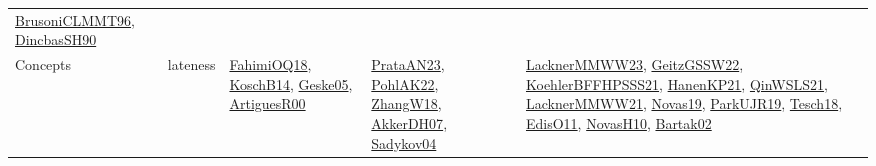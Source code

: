 {\begin{longtable}{lp{3cm}>{\raggedright}p{6cm}>{\raggedright}p{6cm}p{8cm}}
\href{papers/BrusoniCLMMT96.pdf}{BrusoniCLMMT96}\cite{BrusoniCLMMT96}, \href{articles/DincbasSH90.pdf}{DincbasSH90}\cite{DincbasSH90}\\
Concepts & lateness & \href{articles/FahimiOQ18.pdf}{FahimiOQ18}\cite{FahimiOQ18}, \href{papers/KoschB14.pdf}{KoschB14}\cite{KoschB14}, \href{papers/Geske05.pdf}{Geske05}\cite{Geske05}, \href{articles/ArtiguesR00.pdf}{ArtiguesR00}\cite{ArtiguesR00} & \href{articles/PrataAN23.pdf}{PrataAN23}\cite{PrataAN23}, \href{articles/PohlAK22.pdf}{PohlAK22}\cite{PohlAK22}, \href{articles/ZhangW18.pdf}{ZhangW18}\cite{ZhangW18}, \href{papers/AkkerDH07.pdf}{AkkerDH07}\cite{AkkerDH07}, \href{papers/Sadykov04.pdf}{Sadykov04}\cite{Sadykov04} & \href{articles/LacknerMMWW23.pdf}{LacknerMMWW23}\cite{LacknerMMWW23}, \href{papers/GeitzGSSW22.pdf}{GeitzGSSW22}\cite{GeitzGSSW22}, \href{articles/KoehlerBFFHPSSS21.pdf}{KoehlerBFFHPSSS21}\cite{KoehlerBFFHPSSS21}, \href{papers/HanenKP21.pdf}{HanenKP21}\cite{HanenKP21}, \href{articles/QinWSLS21.pdf}{QinWSLS21}\cite{QinWSLS21}, \href{papers/LacknerMMWW21.pdf}{LacknerMMWW21}\cite{LacknerMMWW21}, \href{articles/Novas19.pdf}{Novas19}\cite{Novas19}, \href{papers/ParkUJR19.pdf}{ParkUJR19}\cite{ParkUJR19}, \href{papers/Tesch18.pdf}{Tesch18}\cite{Tesch18}, \href{papers/EdisO11.pdf}{EdisO11}\cite{EdisO11}, \href{articles/NovasH10.pdf}{NovasH10}\cite{NovasH10}, \href{papers/Bartak02.pdf}{Bartak02}\cite{Bartak02}\\

\end{longtable}}
